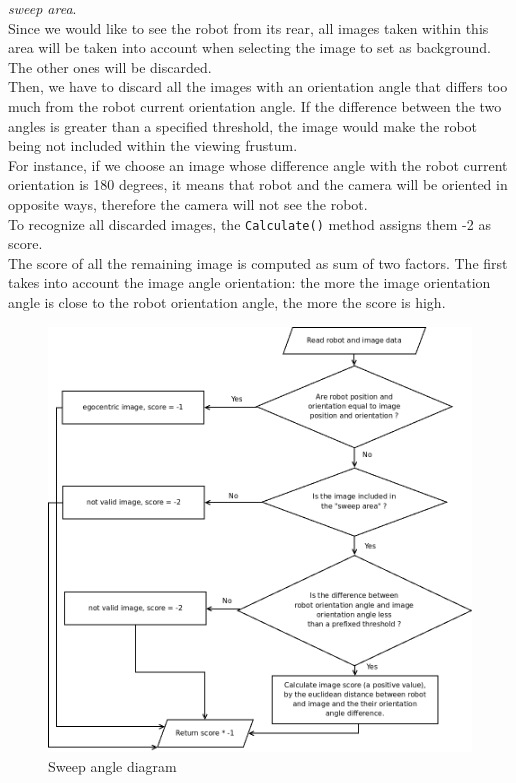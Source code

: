 \textit{sweep area}.
\\
Since we would like to see the robot from its rear, 
all images taken within this area will be taken into account
when selecting the image to set as background.
The other ones will be discarded.
\\
Then, we have to discard all the images with an orientation 
angle that differs too much from the robot current orientation angle. 
If the difference between the two angles is greater than a specified 
threshold, the image would make the robot being not included 
within the viewing frustum.
\\
For instance, if we choose an image whose difference angle with 
the robot current orientation is 180 degrees, it means that robot and 
the camera will be oriented in opposite ways, 
therefore the camera will not see the robot.
\\
To recognize all discarded images, the \texttt{Calculate()} method 
assigns them -2 as score.
\\
The score of all the remaining image is computed as sum 
of two factors.
The first takes into account the image angle orientation: 
the more the image orientation angle is close to the 
robot orientation angle, the more the score is high.
\begin{figure}[!h]
  \begin{center}
    \includegraphics[width=\textwidth]{img/sweep_angle_diagram.png} 
    \caption{Sweep angle diagram}
    \label{fig:sweep_angle_diagram}
  \end{center}
\end{figure}
